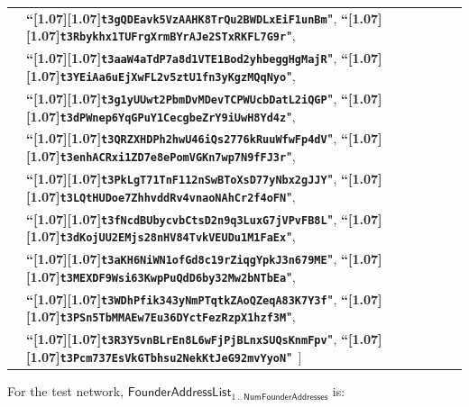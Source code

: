 \documentclass{article}
\let\oldtexttt\texttt
\renewcommand{\texttt}[1]{\scalebox{1.02}[1.07]{\oldtexttt{#1}}}
\newcommand{\introlist}{\needspace{15ex}}
\numberwithin{theorem}{subsection}
\newcommand{\ascii}[1]{\textbf{``\texttt{#1}"}}
\newcommand{\barerange}[2]{{#1}\,..\,{#2}}
\newcommand{\NumFounderAddresses}{\mathsf{NumFounderAddresses}}
\newcommand{\FounderAddressList}{\mathsf{FounderAddressList}}
\begin{document}
\begin{tabular}{@{\hskip 2.5em}l@{\;}l}
 & \ascii{t3gQDEavk5VzAAHK8TrQu2BWDLxEiF1unBm}, \ascii{t3Rbykhx1TUFrgXrmBYrAJe2STxRKFL7G9r}, \\
 & \ascii{t3aaW4aTdP7a8d1VTE1Bod2yhbeggHgMajR}, \ascii{t3YEiAa6uEjXwFL2v5ztU1fn3yKgzMQqNyo}, \\
 & \ascii{t3g1yUUwt2PbmDvMDevTCPWUcbDatL2iQGP}, \ascii{t3dPWnep6YqGPuY1CecgbeZrY9iUwH8Yd4z}, \\
 & \ascii{t3QRZXHDPh2hwU46iQs2776kRuuWfwFp4dV}, \ascii{t3enhACRxi1ZD7e8ePomVGKn7wp7N9fFJ3r}, \\
 & \ascii{t3PkLgT71TnF112nSwBToXsD77yNbx2gJJY}, \ascii{t3LQtHUDoe7ZhhvddRv4vnaoNAhCr2f4oFN}, \\
 & \ascii{t3fNcdBUbycvbCtsD2n9q3LuxG7jVPvFB8L}, \ascii{t3dKojUU2EMjs28nHV84TvkVEUDu1M1FaEx}, \\
 & \ascii{t3aKH6NiWN1ofGd8c19rZiqgYpkJ3n679ME}, \ascii{t3MEXDF9Wsi63KwpPuQdD6by32Mw2bNTbEa}, \\
 & \ascii{t3WDhPfik343yNmPTqtkZAoQZeqA83K7Y3f}, \ascii{t3PSn5TbMMAEw7Eu36DYctFezRzpX1hzf3M}, \\
 & \ascii{t3R3Y5vnBLrEn8L6wFjPjBLnxSUQsKnmFpv}, \ascii{t3Pcm737EsVkGTbhsu2NekKtJeG92mvYyoN}\, ]
\end{tabular}

\introlist
For the test network, $\FounderAddressList_{\barerange{\mathrm{1}}{\NumFounderAddresses}}$ is:
\end{document}
